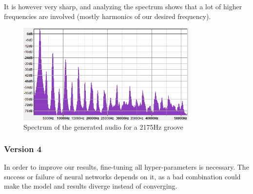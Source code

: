 \documentclass[12pt, twoside]{article}
\begin{document}
It is however very sharp, and analyzing the spectrum shows that a lot of higher frequencies are involved (mostly harmonics of our desired frequency).

\begin{figure}
	\centering
	\includegraphics[width=0.8\textwidth]{../images/spectrometer_2175_v4.png}
	\caption{Spectrum of the generated audio for a 2175Hz groove}
	\label{spectrum2175}
\end{figure}

\subsubsection{Version 4}
In order to improve our results, fine-tuning all hyper-parameters is necessary. The success or failure of neural networks depends on it, as a bad combination could make the model and results diverge instead of converging.
\end{document}
